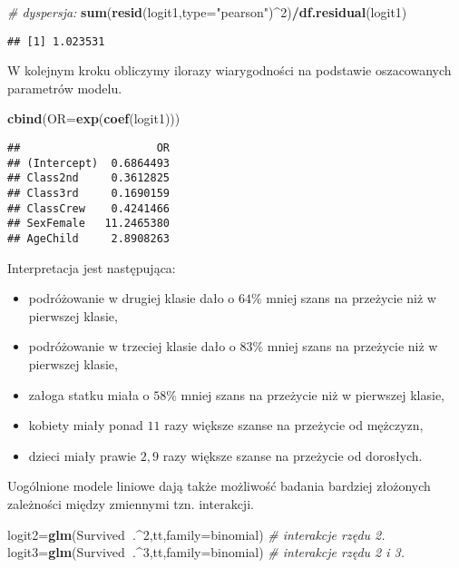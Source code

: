 \documentclass[polish,]{book}
\newenvironment{Shaded}{\begin{snugshade}}{\end{snugshade}}
\newcommand{\CommentTok}[1]{\textcolor[rgb]{0.56,0.35,0.01}{\textit{#1}}}
\newcommand{\DataTypeTok}[1]{\textcolor[rgb]{0.13,0.29,0.53}{#1}}
\newcommand{\DecValTok}[1]{\textcolor[rgb]{0.00,0.00,0.81}{#1}}
\newcommand{\KeywordTok}[1]{\textcolor[rgb]{0.13,0.29,0.53}{\textbf{#1}}}
\newcommand{\NormalTok}[1]{#1}
\newcommand{\OperatorTok}[1]{\textcolor[rgb]{0.81,0.36,0.00}{\textbf{#1}}}
\newcommand{\StringTok}[1]{\textcolor[rgb]{0.31,0.60,0.02}{#1}}
\begin{document}
\begin{Shaded}
\begin{Highlighting}[]
\CommentTok{# dyspersja:}
\KeywordTok{sum}\NormalTok{(}\KeywordTok{resid}\NormalTok{(logit1,}\DataTypeTok{type=}\StringTok{"pearson"}\NormalTok{)}\OperatorTok{^}\DecValTok{2}\NormalTok{)}\OperatorTok{/}\KeywordTok{df.residual}\NormalTok{(logit1)}
\end{Highlighting}
\end{Shaded}

\begin{verbatim}
## [1] 1.023531
\end{verbatim}

W kolejnym kroku obliczymy ilorazy wiarygodności na podstawie oszacowanych
parametrów modelu.

\begin{Shaded}
\begin{Highlighting}[]
\KeywordTok{cbind}\NormalTok{(}\DataTypeTok{OR=}\KeywordTok{exp}\NormalTok{(}\KeywordTok{coef}\NormalTok{(logit1)))}
\end{Highlighting}
\end{Shaded}

\begin{verbatim}
##                     OR
## (Intercept)  0.6864493
## Class2nd     0.3612825
## Class3rd     0.1690159
## ClassCrew    0.4241466
## SexFemale   11.2465380
## AgeChild     2.8908263
\end{verbatim}

Interpretacja jest następująca:

\begin{itemize}
\item
  podróżowanie w drugiej klasie dało o \(64\%\) mniej szans na przeżycie niż w
  pierwszej klasie,
\item
  podróżowanie w trzeciej klasie dało o \(83\%\) mniej szans na przeżycie niż w
  pierwszej klasie,
\item
  załoga statku miała o \(58\%\) mniej szans na przeżycie niż w pierwszej klasie,
\item
  kobiety miały ponad \(11\) razy większe szanse na przeżycie od mężczyzn,
\item
  dzieci miały prawie \(2,9\) razy większe szanse na przeżycie od dorosłych.
\end{itemize}

Uogólnione modele liniowe dają także możliwość badania bardziej złożonych zależności między zmiennymi tzn. interakcji.

\begin{Shaded}
\begin{Highlighting}[]
\NormalTok{logit2=}\KeywordTok{glm}\NormalTok{(Survived}\OperatorTok{~}\NormalTok{.}\OperatorTok{^}\DecValTok{2}\NormalTok{,tt,}\DataTypeTok{family=}\NormalTok{binomial) }\CommentTok{# interakcje rzędu 2.}
\NormalTok{logit3=}\KeywordTok{glm}\NormalTok{(Survived}\OperatorTok{~}\NormalTok{.}\OperatorTok{^}\DecValTok{3}\NormalTok{,tt,}\DataTypeTok{family=}\NormalTok{binomial) }\CommentTok{# interakcje rzędu 2 i 3.}
\end{Highlighting}
\end{Shaded}
\end{document}
